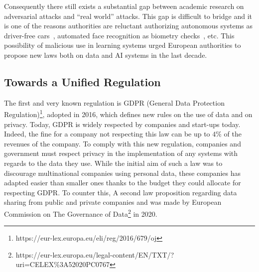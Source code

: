 Consequently there still exists a substantial gap between academic research on adversarial attacks and ``real world'' attacks. This gap is difficult to bridge and it is one of the reasons authorities are reluctant authorizing autonomous systems as driver-free cars~\citep{eykholt2018robust}, automated face recognition as biometry checks~\citep{dong2019efficient}, etc. This possibility of malicious use in learning systems urged European authorities to propose new laws both on data and AI systems in the last decade.
\subsection{Towards a Unified Regulation}




The first and very known regulation is GDPR (General Data Protection Regulation)\footnote{https://eur-lex.europa.eu/eli/reg/2016/679/oj}, adopted in 2016, which defines new rules on the use of data and on privacy. Today, GDPR is widely respected by companies and start-ups today. Indeed, the fine for a company not respecting this law can be up to $4\%$ of the revenues of the company. To comply with this new regulation, companies and government must respect privacy in the implementation of any systems with regards to the data they use.  While the initial aim of such a law was to discourage multinational companies using personal data, these companies has adapted easier than smaller ones thanks to the budget they could allocate for respecting GDPR. To counter this, A second law proposition regarding data sharing from public and private companies and was made by European Commission on The Governance of Data\footnote{https://eur-lex.europa.eu/legal-content/EN/TXT/?uri=CELEX\%3A52020PC0767} in 2020.




